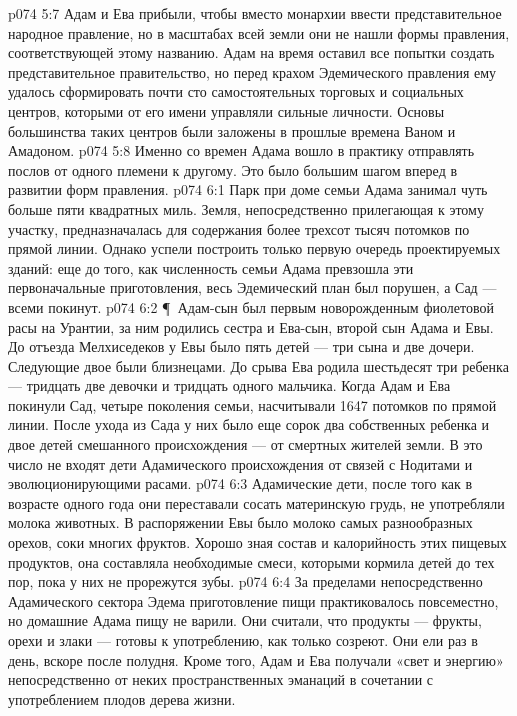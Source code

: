 \vs p074 5:7 Адам и Ева прибыли, чтобы вместо монархии ввести представительное народное правление, но в масштабах всей земли они не нашли формы правления, соответствующей этому названию. Адам на время оставил все попытки создать представительное правительство, но перед крахом Эдемического правления ему удалось сформировать почти сто самостоятельных торговых и социальных центров, которыми от его имени управляли сильные личности. Основы большинства таких центров были заложены в прошлые времена Ваном и Амадоном.
\vs p074 5:8 Именно со времен Адама вошло в практику отправлять послов от одного племени к другому. Это было большим шагом вперед в развитии форм правления.
\vs p074 6:1 Парк при доме семьи Адама занимал чуть больше пяти квадратных миль. Земля, непосредственно прилегающая к этому участку, предназначалась для содержания более трехсот тысяч потомков по прямой линии. Однако успели построить только первую очередь проектируемых зданий: еще до того, как численность семьи Адама превзошла эти первоначальные приготовления, весь Эдемический план был порушен, а Сад --- всеми покинут.
\vs p074 6:2 \P\ Адам\hyp{}сын был первым новорожденным фиолетовой расы на Урантии, за ним родились сестра и Ева\hyp{}сын, второй сын Адама и Евы. До отъезда Мелхиседеков у Евы было пять детей --- три сына и две дочери. Следующие двое были близнецами. До срыва Ева родила шестьдесят три ребенка --- тридцать две девочки и тридцать одного мальчика. Когда Адам и Ева покинули Сад, четыре поколения семьи, насчитывали 1647 потомков по прямой линии. После ухода из Сада у них было еще сорок два собственных ребенка и двое детей смешанного происхождения --- от смертных жителей земли. В это число не входят дети Адамического происхождения от связей с Нодитами и эволюционирующими расами.
\vs p074 6:3 Адамические дети, после того как в возрасте одного года они переставали сосать материнскую грудь, не употребляли молока животных. В распоряжении Евы было молоко самых разнообразных орехов, соки многих фруктов. Хорошо зная состав и калорийность этих пищевых продуктов, она составляла необходимые смеси, которыми кормила детей до тех пор, пока у них не прорежутся зубы.
\vs p074 6:4 За пределами непосредственно Адамического сектора Эдема приготовление пищи практиковалось повсеместно, но домашние Адама пищу не варили. Они считали, что продукты --- фрукты, орехи и злаки --- готовы к употреблению, как только созреют. Они ели раз в день, вскоре после полудня. Кроме того, Адам и Ева получали «свет и энергию» непосредственно от неких пространственных эманаций в сочетании с употреблением плодов дерева жизни.
